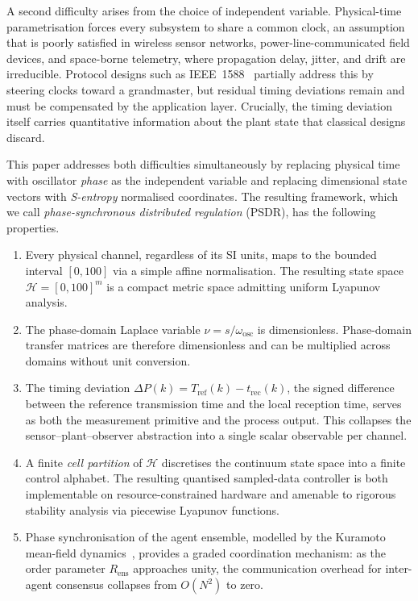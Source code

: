 \documentclass[10pt,twocolumn]{article}
\theoremstyle{plain}
\theoremstyle{definition}
\theoremstyle{remark}
\newcommand{\Hcal}{\mathcal{H}}
\newcommand{\DeltaP}{\Delta P}
\newcommand{\omegaosc}{\omega_{\mathrm{osc}}}
\newcommand{\Rens}{R_{\mathrm{ens}}}
\newcommand{\Tref}{T_{\mathrm{ref}}}
\newcommand{\trec}{t_{\mathrm{rec}}}
\begin{document}
A second difficulty arises from the choice of independent variable.
Physical-time parametrisation forces every subsystem to share a common
clock, an assumption that is poorly satisfied in wireless sensor networks,
power-line-communicated field devices, and space-borne telemetry, where
propagation delay, jitter, and drift are irreducible.  Protocol designs
such as IEEE~1588~\cite{IEEE1588} partially address this by steering
clocks toward a grandmaster, but residual timing deviations remain and
must be compensated by the application layer.  Crucially, the timing
deviation itself carries quantitative information about the plant state
that classical designs discard.

This paper addresses both difficulties simultaneously by replacing
physical time with oscillator \emph{phase} as the independent variable
and replacing dimensional state vectors with \emph{S-entropy} normalised
coordinates.  The resulting framework, which we call
\emph{phase-synchronous distributed regulation} (PSDR), has the
following properties.

\begin{enumerate}
  \item Every physical channel, regardless of its SI units, maps to the
        bounded interval $[0,100]$ via a simple affine normalisation.
        The resulting state space $\Hcal = [0,100]^m$ is a compact
        metric space admitting uniform Lyapunov analysis.

  \item The phase-domain Laplace variable $\nu = s/\omegaosc$ is
        dimensionless.  Phase-domain transfer matrices are therefore
        dimensionless and can be multiplied across domains without unit
        conversion.

  \item The timing deviation $\DeltaP(k) = \Tref(k) - \trec(k)$, the
        signed difference between the reference transmission time and
        the local reception time, serves as both the measurement
        primitive and the process output.  This collapses the
        sensor--plant--observer abstraction into a single scalar
        observable per channel.

  \item A finite \emph{cell partition} of $\Hcal$ discretises the
        continuum state space into a finite control alphabet.  The
        resulting quantised sampled-data controller is both implementable
        on resource-constrained hardware and amenable to rigorous
        stability analysis via piecewise Lyapunov functions.

  \item Phase synchronisation of the agent ensemble, modelled by the
        Kuramoto mean-field dynamics~\cite{Strogatz2000,Acerbron2005},
        provides a graded coordination mechanism: as the order parameter
        $\Rens$ approaches unity, the communication overhead for
        inter-agent consensus collapses from $O(N^2)$ to zero.
\end{enumerate}
\end{document}
